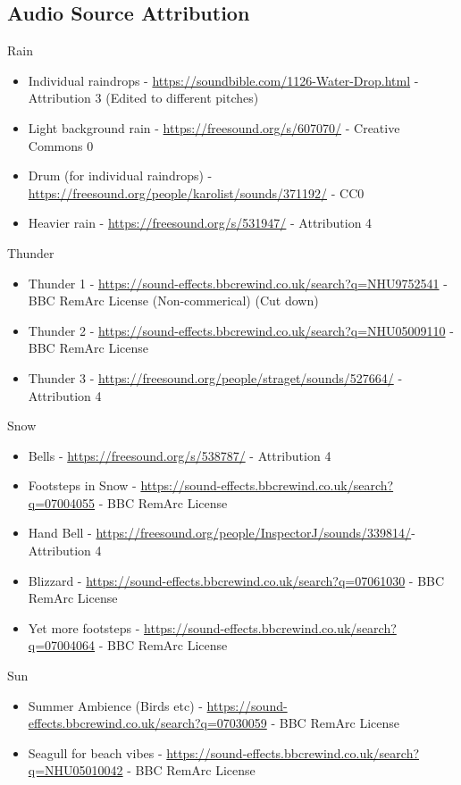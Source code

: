 \documentclass{l4proj}
\begin{document}
\begin{appendices}

\chapter{Audio Source Attribution} \label{adx:audiosources}

Rain \begin{itemize}
    \item Individual raindrops - \url{https://soundbible.com/1126-Water-Drop.html} - Attribution 3 (Edited to different pitches)
    \item Light background rain - \url{https://freesound.org/s/607070/} - Creative Commons 0
    \item Drum (for individual raindrops) - \url{https://freesound.org/people/karolist/sounds/371192/} - CC0
    \item Heavier rain - \url{https://freesound.org/s/531947/} - Attribution 4
\end{itemize}


Thunder \begin{itemize}
    \item Thunder 1 - \url{https://sound-effects.bbcrewind.co.uk/search?q=NHU9752541} - BBC RemArc License (Non-commerical) (Cut down)
    \item Thunder 2 - \url{https://sound-effects.bbcrewind.co.uk/search?q=NHU05009110} - BBC RemArc License
    \item Thunder 3 - \url{https://freesound.org/people/straget/sounds/527664/} - Attribution 4
\end{itemize}


Snow \begin{itemize}
    \item Bells - \url{https://freesound.org/s/538787/} - Attribution 4
    \item Footsteps in Snow - \url{https://sound-effects.bbcrewind.co.uk/search?q=07004055} - BBC RemArc License
    \item Hand Bell - \url{https://freesound.org/people/InspectorJ/sounds/339814/}- Attribution 4
    \item Blizzard - \url{https://sound-effects.bbcrewind.co.uk/search?q=07061030} - BBC RemArc License
    \item Yet more footsteps - \url{https://sound-effects.bbcrewind.co.uk/search?q=07004064} - BBC RemArc License
\end{itemize}


Sun \begin{itemize}
    \item Summer Ambience (Birds etc) - \url{https://sound-effects.bbcrewind.co.uk/search?q=07030059} - BBC RemArc License
    \item Seagull for beach vibes - \url{https://sound-effects.bbcrewind.co.uk/search?q=NHU05010042} - BBC RemArc License
\end{itemize}



\end{appendices}
\end{document}
